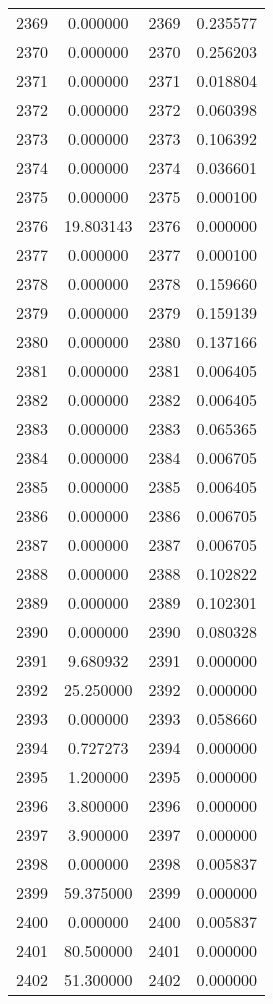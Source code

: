 \documentclass[12pt]{article}
\begin{document}
\begin{longtable}{@{}cccc@{}}
2369 & 0.000000 & 2369 & 0.235577 \\
2370 & 0.000000 & 2370 & 0.256203 \\
2371 & 0.000000 & 2371 & 0.018804 \\
2372 & 0.000000 & 2372 & 0.060398 \\
2373 & 0.000000 & 2373 & 0.106392 \\
2374 & 0.000000 & 2374 & 0.036601 \\
2375 & 0.000000 & 2375 & 0.000100 \\
2376 & 19.803143 & 2376 & 0.000000 \\
2377 & 0.000000 & 2377 & 0.000100 \\
2378 & 0.000000 & 2378 & 0.159660 \\
2379 & 0.000000 & 2379 & 0.159139 \\
2380 & 0.000000 & 2380 & 0.137166 \\
2381 & 0.000000 & 2381 & 0.006405 \\
2382 & 0.000000 & 2382 & 0.006405 \\
2383 & 0.000000 & 2383 & 0.065365 \\
2384 & 0.000000 & 2384 & 0.006705 \\
2385 & 0.000000 & 2385 & 0.006405 \\
2386 & 0.000000 & 2386 & 0.006705 \\
2387 & 0.000000 & 2387 & 0.006705 \\
2388 & 0.000000 & 2388 & 0.102822 \\
2389 & 0.000000 & 2389 & 0.102301 \\
2390 & 0.000000 & 2390 & 0.080328 \\
2391 & 9.680932 & 2391 & 0.000000 \\
2392 & 25.250000 & 2392 & 0.000000 \\
2393 & 0.000000 & 2393 & 0.058660 \\
2394 & 0.727273 & 2394 & 0.000000 \\
2395 & 1.200000 & 2395 & 0.000000 \\
2396 & 3.800000 & 2396 & 0.000000 \\
2397 & 3.900000 & 2397 & 0.000000 \\
2398 & 0.000000 & 2398 & 0.005837 \\
2399 & 59.375000 & 2399 & 0.000000 \\
2400 & 0.000000 & 2400 & 0.005837 \\
2401 & 80.500000 & 2401 & 0.000000 \\
2402 & 51.300000 & 2402 & 0.000000 \\

\end{longtable}
\end{document}

